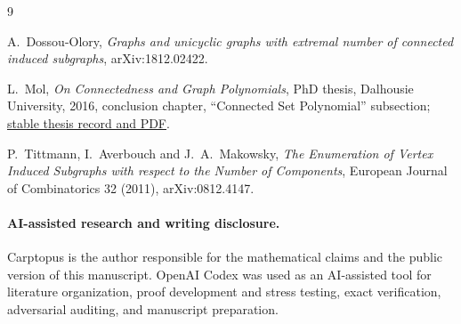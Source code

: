 \documentclass[11pt]{article}
\numberwithin{equation}{section}
\begin{document}
{\small
\begin{thebibliography}{9}

A.~Dossou-Olory,
\emph{Graphs and unicyclic graphs with extremal number of connected induced subgraphs},
arXiv:1812.02422.

L.~Mol,
\emph{On Connectedness and Graph Polynomials},
PhD thesis, Dalhousie University, 2016, conclusion chapter, ``Connected Set Polynomial'' subsection;
\href{https://central.bac-lac.gc.ca/.item?app=Library&id=TC-NSHD-71408&oclc_number=1033184059&op=pdf}{stable thesis record and PDF}.

P.~Tittmann, I.~Averbouch and J.~A.~Makowsky,
\emph{The Enumeration of Vertex Induced Subgraphs with respect to the Number of Components},
European Journal of Combinatorics 32 (2011), arXiv:0812.4147.

\end{thebibliography}
}

\paragraph{AI-assisted research and writing disclosure.}
Carptopus is the author responsible for the mathematical claims and the public version of this
manuscript. OpenAI Codex was used as an AI-assisted tool for literature organization, proof
development and stress testing, exact verification, adversarial auditing, and manuscript
preparation.
\end{document}
